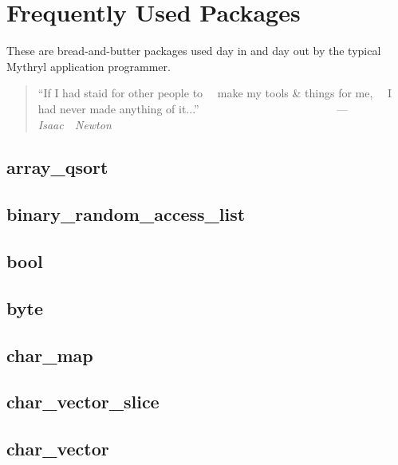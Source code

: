 \section{Frequently Used Packages}

%
%

These are bread-and-butter packages 
used day in and day out by the typical Mythryl 
application programmer.

\begin{quote}\begin{tiny}
            ``If I had staid for other people to\newline
             ~~make my tools & things for me,\newline
             ~~I had never made anything of it...''\newline
             ~~~~~~~~~~~~~~~~~~~~~~~~---{\em Isaac~~Newton}
\end{tiny}\end{quote}


\subsection{array\_qsort}					
\subsection{binary\_random\_access\_list}			
\subsection{bool}						
\subsection{byte}						
\subsection{char\_map}						
\subsection{char\_vector\_slice}				
\subsection{char\_vector}					
